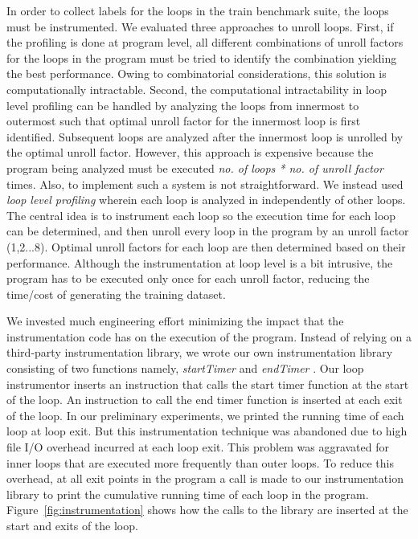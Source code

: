 \documentclass[]{sig-alternate}
\begin{document}
In order to collect labels for the loops in the train benchmark suite, the loops must be instrumented. We evaluated three approaches to unroll loops. First, if the profiling is done at program level, all different combinations of unroll factors for the loops in the program must be tried to identify the combination yielding the best performance. Owing to combinatorial considerations, this solution is computationally intractable. Second, the computational intractability in loop level profiling can be handled by analyzing the loops from innermost to outermost such that optimal unroll factor for the innermost loop is first identified. Subsequent loops are analyzed after the innermost loop is unrolled by the optimal unroll factor. However, this approach is expensive because the program being analyzed must be executed \emph{no. of loops * no. of unroll factor} times. Also, to implement such a system is not straightforward. We instead used \emph{loop level profiling} wherein each loop is analyzed in independently of other loops. The central idea is to instrument each loop so the execution time for each loop can be determined, and then unroll every loop in the program by an unroll factor (1,2...8). Optimal unroll factors for each loop are then determined based on their performance. Although the instrumentation at loop level is a bit intrusive, the program has to be executed only once for each unroll factor, reducing the time/cost of generating the training dataset.

We invested much engineering effort minimizing the impact that the instrumentation code has on the execution of the program. Instead of relying on a third-party instrumentation library, we wrote our own instrumentation library consisting of two functions namely, \emph{startTimer} and \emph{endTimer} . Our loop instrumentor inserts an instruction that calls the start timer function at the start of the loop. An instruction to call the end timer function is inserted at each exit of the loop. In our preliminary experiments, we printed the running time of each loop at loop exit. But this instrumentation technique was abandoned due to high file I/O overhead incurred at each loop exit. This problem was aggravated for inner loops that are executed more frequently than outer loops. To reduce this overhead, at all exit points in the program a call is made to our instrumentation library to print the cumulative running time of each loop in the program. Figure~\ref{fig:instrumentation} shows how the calls to the library are inserted at the start and exits of the loop.
\end{document}
